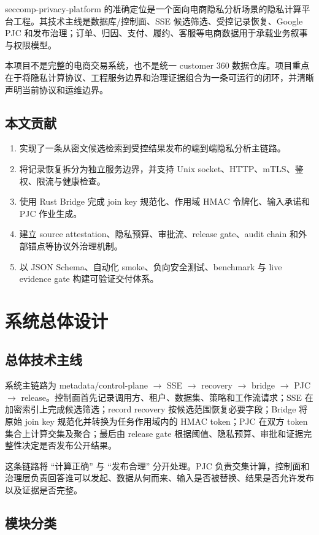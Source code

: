 \documentclass[UTF8,a4paper,12pt,oneside]{ctexrep}
\newcommand{\project}{seccomp-privacy-platform}
\newcommand{\pipeline}{metadata/control-plane $\rightarrow$ SSE $\rightarrow$ recovery $\rightarrow$ bridge $\rightarrow$ PJC $\rightarrow$ release}
\begin{document}
\project{} 的准确定位是一个面向电商隐私分析场景的隐私计算平台工程。其技术主线是数据库/控制面、SSE 候选筛选、受控记录恢复、Google PJC 和发布治理；订单、归因、支付、履约、客服等电商数据用于承载业务叙事与权限模型。

本项目不是完整的电商交易系统，也不是统一 customer 360 数据仓库。项目重点在于将隐私计算协议、工程服务边界和治理证据组合为一条可运行的闭环，并清晰声明当前协议和运维边界。

\section{本文贡献}

\begin{enumerate}
  \item 实现了一条从密文候选检索到受控结果发布的端到端隐私分析主链路。
  \item 将记录恢复拆分为独立服务边界，并支持 Unix socket、HTTP、mTLS、鉴权、限流与健康检查。
  \item 使用 Rust Bridge 完成 join key 规范化、作用域 HMAC 令牌化、输入承诺和 PJC 作业生成。
  \item 建立 source attestation、隐私预算、审批流、release gate、audit chain 和外部锚点等协议外治理机制。
  \item 以 JSON Schema、自动化 smoke、负向安全测试、benchmark 与 live evidence gate 构建可验证交付体系。
\end{enumerate}

\chapter{系统总体设计}

\section{总体技术主线}

系统主链路为 \pipeline。控制面首先记录调用方、租户、数据集、策略和工作流请求；SSE 在加密索引上完成候选筛选；record recovery 按候选范围恢复必要字段；Bridge 将原始 join key 规范化并转换为任务作用域内的 HMAC token；PJC 在双方 token 集合上计算交集及聚合；最后由 release gate 根据阈值、隐私预算、审批和证据完整性决定是否发布公开结果。

这条链路将 ``计算正确'' 与 ``发布合理'' 分开处理。PJC 负责交集计算，控制面和治理层负责回答谁可以发起、数据从何而来、输入是否被替换、结果是否允许发布以及证据是否完整。

\section{模块分类}
\end{document}

